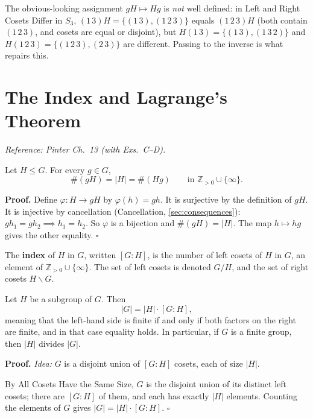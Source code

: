 \documentclass[11pt]{report}
\renewenvironment{proof}[1][Proof]{\noindent\textbf{#1.} }{\hfill$\square$\par\vspace{5pt}}
\begin{document}
\begin{exbox}\label{ex:map-gh-maps-hg-not-well-defined}
The obvious-looking assignment $gH \mapsto Hg$ is \emph{not} well defined: in Left and Right Cosets Differ in $S_3$, $(1\,3)H = \{(1\,3), (1\,2\,3)\}$ equals $(1\,2\,3)H$ (both contain $(1\,2\,3)$, and cosets are equal or disjoint), but $H(1\,3) = \{(1\,3), (1\,3\,2)\}$ and $H(1\,2\,3) = \{(1\,2\,3), (2\,3)\}$ are different. Passing to the inverse is what repairs this.
\end{exbox}

\section{The Index and Lagrange's Theorem}\label{sec:lagrange}

\textit{Reference: Pinter Ch.\ 13 (with Exs.\ C--D).}

\begin{propbox}\label{prop:all-cosets-have-same-size}
Let $H \leq G$. For every $g \in G$,
\[ \#(gH) = |H| = \#(Hg) \qquad \text{in } \mathbb{Z}_{>0} \cup \{\infty\}. \]
\end{propbox}

\begin{proof}
Define $\varphi: H \to gH$ by $\varphi(h) = gh$. It is surjective by the definition of $gH$. It is injective by cancellation (Cancellation, \ref{sec:consequences}): $gh_1 = gh_2 \implies h_1 = h_2$. So $\varphi$ is a bijection and $\#(gH) = |H|$. The map $h \mapsto hg$ gives the other equality.
\end{proof}

\begin{defbox}[Index]\label{def:index}
The \textbf{index} of $H$ in $G$, written $[G : H]$, is the number of left cosets of $H$ in $G$, an element of $\mathbb{Z}_{>0} \cup \{\infty\}$. The set of left cosets is denoted $G/H$, and the set of right cosets $H \backslash G$.
\end{defbox}

\begin{thmbox}[Lagrange]\label{thm:lagrange}
Let $H$ be a subgroup of $G$. Then
\[ |G| = |H| \cdot [G : H], \]
meaning that the left-hand side is finite if and only if both factors on the right are finite, and in that case equality holds. In particular, if $G$ is a finite group, then $|H|$ divides $|G|$.
\end{thmbox}

\begin{proof}
\textit{Idea:} $G$ is a disjoint union of $[G : H]$ cosets, each of size $|H|$.\par
By All Cosets Have the Same Size, $G$ is the disjoint union of its distinct left cosets; there are $[G : H]$ of them, and each has exactly $|H|$ elements. Counting the elements of $G$ gives $|G| = |H| \cdot [G : H]$.
\end{proof}
\end{document}
